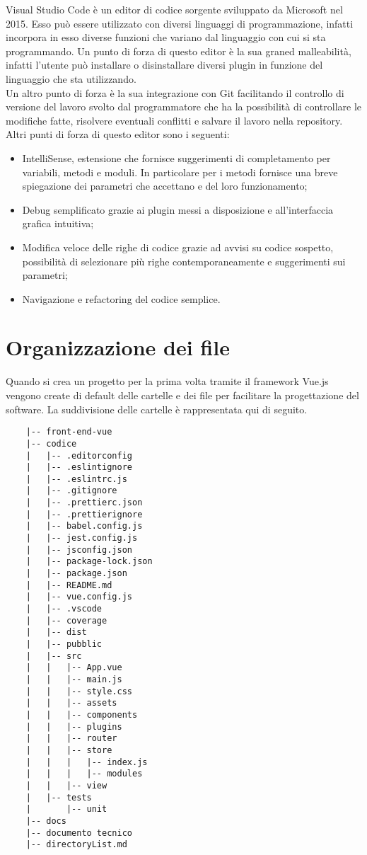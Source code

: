 Visual Studio Code è un editor di codice sorgente sviluppato da Microsoft nel 2015. Esso può essere utilizzato con diversi linguaggi di programmazione, infatti incorpora in esso diverse funzioni che variano dal linguaggio con cui si sta programmando. Un punto di forza di questo editor è la sua graned malleabilità, infatti l'utente può installare o disinstallare diversi plugin in funzione del linguaggio che sta utilizzando.\\
Un altro punto di forza è la sua integrazione con Git facilitando il controllo di versione del lavoro svolto dal programmatore che ha la possibilità di controllare le modifiche fatte, risolvere eventuali conflitti e salvare il lavoro nella repository. Altri punti di forza di questo editor sono i seguenti:
\begin{itemize}
	\item IntelliSense, estensione che fornisce suggerimenti di completamento per variabili, metodi e moduli. In particolare per i metodi fornisce una breve spiegazione dei parametri che accettano e del loro funzionamento;
	\item Debug semplificato grazie ai plugin messi a disposizione e all'interfaccia grafica intuitiva;
	\item Modifica veloce delle righe di codice grazie ad avvisi su codice sospetto, possibilità di selezionare più righe contemporaneamente e suggerimenti sui parametri;
	\item Navigazione e refactoring del codice semplice.
\end{itemize}

\section{Organizzazione dei file}
\label{sec:organizzazione-file}

Quando si crea un progetto per la prima volta tramite il framework Vue.js vengono create di default delle cartelle e dei file per facilitare la progettazione del software. La suddivisione delle cartelle è rappresentata qui di seguito.

\begin{lstlisting}
	|-- front-end-vue
	|-- codice
	|   |-- .editorconfig
	|   |-- .eslintignore
	|   |-- .eslintrc.js
	|   |-- .gitignore
	|   |-- .prettierc.json
	|   |-- .prettierignore
	|   |-- babel.config.js
	|   |-- jest.config.js
	|   |-- jsconfig.json
	|   |-- package-lock.json
	|   |-- package.json
	|   |-- README.md
	|   |-- vue.config.js
	|   |-- .vscode
	|   |-- coverage
	|   |-- dist
	|   |-- pubblic
	|   |-- src
	|   |   |-- App.vue
	|   |   |-- main.js
	|   |   |-- style.css
	|   |   |-- assets
	|   |   |-- components
	|   |   |-- plugins
	|   |   |-- router
	|   |   |-- store
	|   |   |   |-- index.js
	|   |   |   |-- modules
	|   |   |-- view
	|   |-- tests
	|       |-- unit
	|-- docs
	|-- documento tecnico
	|-- directoryList.md
\end{lstlisting}

